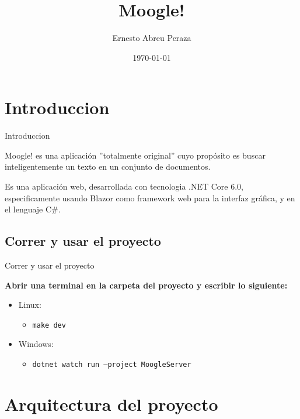 \documentclass[11pt]{beamer}
\author{Ernesto Abreu Peraza}
\title{Moogle!}
\institute{Universidad de la Habana}
\date{\today}
\begin{document}
\begin{frame}
\titlepage
\end{frame}

\begin{frame}
\tableofcontents
\end{frame}


\section{Introduccion}

\begin{frame}{Introduccion}

Moogle! es una aplicación ”totalmente original” cuyo propósito es buscar inteligentemente un texto en un conjunto de documentos.

Es una aplicación web, desarrollada con tecnologia .NET Core 6.0, especificamente
usando Blazor como framework web para la interfaz gráfica, y en el lenguaje C\#.

\end{frame}

\subsection{Correr y usar el proyecto}

\begin{frame}{Correr y usar el proyecto}

    \textbf{Abrir una terminal en la carpeta del proyecto y escribir lo siguiente:}
    
    \begin{itemize}
        \item Linux:
              \begin{itemize} \item \texttt{make dev} \end{itemize}
        \item Windows:
              \begin{itemize} \item \texttt{dotnet watch run --project MoogleServer}\end{itemize}
    \end{itemize}

\end{frame}

\section{Arquitectura del proyecto}
\end{document}
